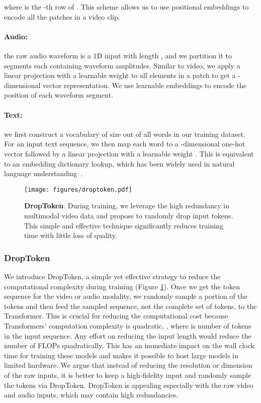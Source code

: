 \documentclass[10pt,twocolumn,letterpaper]{article}
\begin{document}
where  is the -th row of . This scheme allows us to use  positional embeddings to encode all the  patches in a video clip.

\paragraph{Audio:} the raw audio waveform is a 1D input with length , and we partition it to  segments each containing  waveform amplitudes. Similar to video, we apply a linear projection with a learnable weight  to all elements in a patch to get a -dimensional vector representation. We use  learnable embeddings to encode the position of each waveform segment.

\paragraph{Text:} we first construct a vocabulary of size  out of all words in our training dataset. For an input text sequence, we then map each word to a -dimensional one-hot vector followed by a linear projection with a learnable weight . This is equivalent to an embedding dictionary lookup, which has been widely used in natural language understanding~\cite{mikolov2013efficient}.

\begin{figure}[t]
\centering
   \texttt{[image: figures/droptoken.pdf]}
   \caption{\textbf{DropToken}. During training, we leverage the high redundancy in multimodal video data and propose to randomly drop input tokens. This simple and effective technique significantly reduces training time with little loss of quality.
   }
\label{fig:drop-token}
\vspace{-4mm}
\end{figure}

\subsubsection{DropToken}
We introduce DropToken, a simple yet effective strategy to reduce the computational complexity during training (Figure \ref{fig:drop-token}). Once we get the token sequence for the video or audio modality, we randomly sample a portion of the tokens and then feed the sampled sequence, not the complete set of tokens, to the Transformer. This is crucial for reducing the computational cost because Transformers' computation complexity is quadratic, , where  is number of tokens in the input sequence. Any effort on reducing the input length would reduce the number of FLOPs quadratically. This has an immediate impact on the wall clock time for training these models and makes it possible to host large models in limited hardware. We argue that instead of reducing the resolution or dimension of the raw inputs, it is better to keep a high-fidelity input and randomly sample the tokens via DropToken. DropToken is appealing especially with the raw video and audio inputs, which may contain high redundancies.
\end{document}
